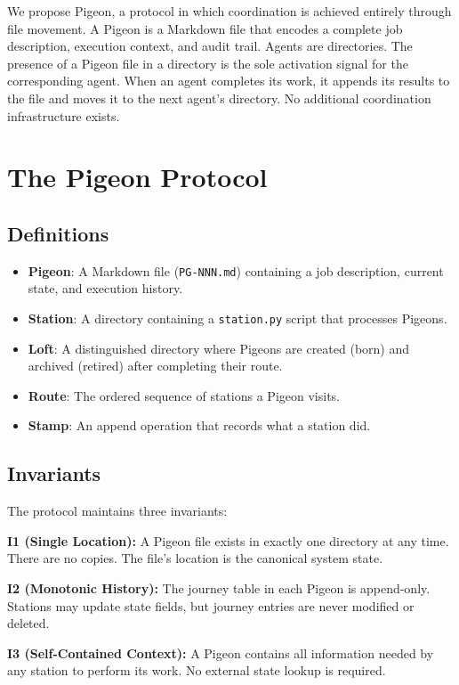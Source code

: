 \documentclass[11pt,a4paper]{article}
\begin{document}
We propose Pigeon, a protocol in which coordination is achieved entirely through file movement. A Pigeon is a Markdown file that encodes a complete job description, execution context, and audit trail. Agents are directories. The presence of a Pigeon file in a directory is the sole activation signal for the corresponding agent. When an agent completes its work, it appends its results to the file and moves it to the next agent's directory. No additional coordination infrastructure exists.

\section{The Pigeon Protocol}

\subsection{Definitions}

\begin{itemize}
    \item \textbf{Pigeon}: A Markdown file (\texttt{PG-NNN.md}) containing a job description, current state, and execution history.
    \item \textbf{Station}: A directory containing a \texttt{station.py} script that processes Pigeons.
    \item \textbf{Loft}: A distinguished directory where Pigeons are created (born) and archived (retired) after completing their route.
    \item \textbf{Route}: The ordered sequence of stations a Pigeon visits.
    \item \textbf{Stamp}: An append operation that records what a station did.
\end{itemize}

\subsection{Invariants}

The protocol maintains three invariants:

\textbf{I1 (Single Location):} A Pigeon file exists in exactly one directory at any time. There are no copies. The file's location is the canonical system state.

\textbf{I2 (Monotonic History):} The journey table in each Pigeon is append-only. Stations may update state fields, but journey entries are never modified or deleted.

\textbf{I3 (Self-Contained Context):} A Pigeon contains all information needed by any station to perform its work. No external state lookup is required.
\end{document}
